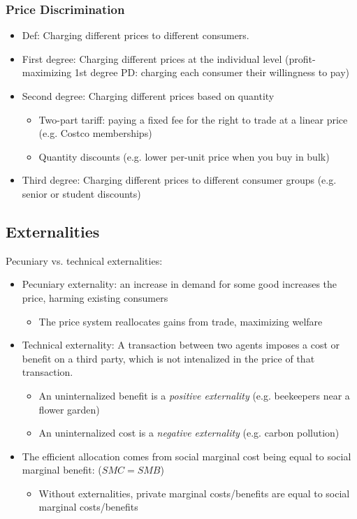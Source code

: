 \documentclass{article}
\newcommand{\blue}[1]{{\color{blue}#1}}
\begin{document}
\subsubsection{Price Discrimination}
\begin{itemize}
	\item \blue{Def:} Charging different prices to different consumers.
	\item First degree: Charging different prices at the individual level (profit-maximizing 1st degree PD: charging each consumer their willingness to pay)
	\item Second degree: Charging different prices based on quantity
		\begin{itemize}
			\item \blue{Two-part tariff:} paying a fixed fee for the right to trade at a linear price (e.g. Costco memberships)
			\item Quantity discounts (e.g. lower per-unit price when you buy in bulk)
		\end{itemize}
	\item Third degree: Charging different prices to different consumer groups (e.g. senior or student discounts)
\end{itemize}



\subsection{Externalities}
Pecuniary vs. technical externalities:
\begin{itemize}
	\item Pecuniary externality: an increase in demand for some good increases the price, harming existing consumers 
		\begin{itemize}
			\item The price system reallocates gains from trade, maximizing welfare
		\end{itemize}
	\item \blue{Technical externality:} A transaction between two agents imposes a cost or benefit on a third party, which is not intenalized in the price of that transaction.
		\begin{itemize}
			\item An uninternalized benefit is a \textit{positive externality} (e.g. beekeepers near a flower garden)
			\item An uninternalized cost is a \textit{negative externality} (e.g. carbon pollution)
		\end{itemize}
	\item The efficient allocation comes from social marginal cost being equal to social marginal benefit: ($SMC=SMB$)
		\begin{itemize}
			\item Without externalities, private marginal costs/benefits are equal to social marginal costs/benefits
		\end{itemize}
\end{itemize}
\end{document}
